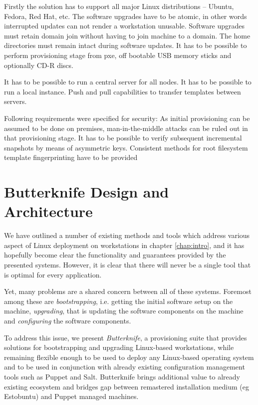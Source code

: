 \documentclass[a4paper,11pt]{kth-mag}
\begin{document}
Firstly the solution has to support all major Linux distributions
-- Ubuntu, Fedora, Red Hat, etc.
The software upgrades have to be atomic, in other words
interrupted updates can not render a workstation unusable.
Software upgrades must retain domain join without having
to join machine to a domain.
The home directories must remain intact during software updates.
It has to be possible to perform provisioning stage
from \acrfull{pxe},
off bootable USB memory sticks and optionally CD-R discs.


It has to be possible to run a central server for all nodes.
It has to be possible to run a local instance.
Push and pull capabilities to transfer templates between servers.

Following requirements were specified for security:
As initial provisioning can be assumed to be done on premises,
man-in-the-middle attacks can be ruled out in that
provisioning stage.
It has to be possible to verify subsequent incremental snapshots by means of asymmetric keys.
Consistent methods for root filesystem template fingerprinting have to be provided

%
%
%
%
\chapter{Butterknife Design and Architecture}
\label{chap:design}
We have outlined a number of existing methods and tools
which address various aspect of Linux deployment on workstations
in chapter \ref{chap:intro}, and it has hopefully become clear
the functionality and guarantees provided by the presented systems.
However, it is clear that there will never be a single tool
that is optimal for every application.

Yet, many problems are a shared concern between all of these systems.
Foremost among these are \emph{bootstrapping}, i.e. getting
the initial software setup on the machine,
\emph{upgrading}, that is updating the software components on the machine and
\emph{configuring} the software components.

To address this issue, we present \emph{Butterknife},
a provisioning suite that provides solutions for bootstrapping and
upgrading Linux-based workstations, while remaining flexible enough
to be used to deploy any Linux-based operating system
and to be used in conjunction with already existing
configuration management tools such as Puppet and Salt.
Butterknife brings additional value to already existing
ecosystem and bridges gap between remastered installation medium
(eg Estobuntu) and Puppet managed machines.
\end{document}
